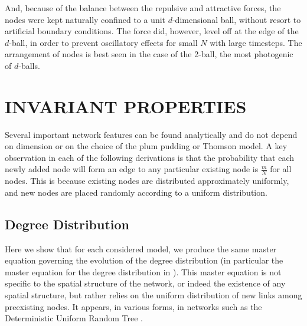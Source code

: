 \documentclass[aps,pre,reprint,superscriptaddress,amsmath,amssymb,nofootinbib]{revtex4-1}
\begin{document}
And, because of the balance between the repulsive and attractive forces, the nodes were kept naturally confined to a unit $d$-dimensional ball, without resort to artificial boundary conditions.  
The force did, however, level off at the edge of the $d$-ball, in order to prevent oscillatory effects for small $N$ with large timesteps.  
The arrangement of nodes is best seen in the case of the 2-ball, the most photogenic of $d$-balls.  

\section{INVARIANT PROPERTIES}
Several important network features can be found analytically and do not depend on dimension or on the choice of the plum pudding or Thomson model.
A key observation in each of the following derivations is that the probability that each newly added node will form an edge to any particular existing node is $\frac{m}{N}$ for all nodes.
This is because existing nodes are distributed approximately uniformly, and new nodes are placed randomly according to a uniform distribution.

\subsection{Degree Distribution}
Here we show that for each considered model, we produce the same master equation governing the evolution of the degree distribution (in particular the master equation for the degree distribution in \cite{ozik2004}).  
This master equation is not specific to the spatial structure of the network, or indeed the existence of any spatial structure, but rather relies on the uniform distribution of new links among preexisting nodes.  
It appears, in various forms, in networks such as the Deterministic Uniform Random Tree \cite{zhang2008topologies}.
\end{document}
